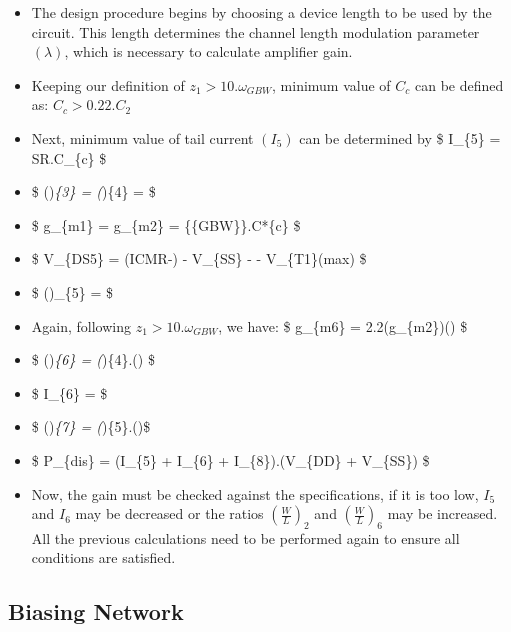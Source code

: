 \documentclass[
]{article}
\begin{document}
\begin{itemize}
\item
  The design procedure begins by choosing a device length to be used by
  the circuit. This length determines the channel length modulation
  parameter \((\lambda)\), which is necessary to calculate amplifier
  gain.
\item
  Keeping our definition of \(z_{1} > 10.{\omega_{GBW}}\), minimum value
  of \(C_{c}\) can be defined as: \(C_{c} > 0.22.C_{2}\)
\item
  Next, minimum value of tail current \((I_{5})\) can be determined by
  \$ I\_\{5\} = SR.C\_\{c\} \$
\item
  \$ ()\emph{\{3\} = (})\{4\} =
   \$
\item
  \$ g\_\{m1\} = g\_\{m2\} = \{\omega*\{GBW\}\}.C*\{c\} \$
\item
  \$ V\_\{DS5\} = (ICMR-) - V\_\{SS\} -
   - V\_\{T1\}(max) \$
\item
  \$ ()\_\{5\} =  \$
\item
  Again, following \(z_{1} > 10.{\omega_{GBW}}\), we have: \$ g\_\{m6\}
  = 2.2(g\_\{m2\})() \$
\item
  \$ ()\emph{\{6\} =
  (})\{4\}.() \$
\item
  \$ I\_\{6\} =  \$
\item
  \$ ()\emph{\{7\} =
  (})\{5\}.()\$
\item
  \$ P\_\{dis\} = (I\_\{5\} + I\_\{6\} + I\_\{8\}).(V\_\{DD\} +
  \textbar V\_\{SS\}\textbar) \$
\item
  Now, the gain must be checked against the specifications, if it is too
  low, \(I_{5}\) and \(I_{6}\) may be decreased or the ratios
  \((\frac{W}{L})_{2}\) and \((\frac{W}{L})_{6}\) may be increased. All
  the previous calculations need to be performed again to ensure all
  conditions are satisfied.
\end{itemize}

\subsection{Biasing Network}\label{biasing-network}
\end{document}
